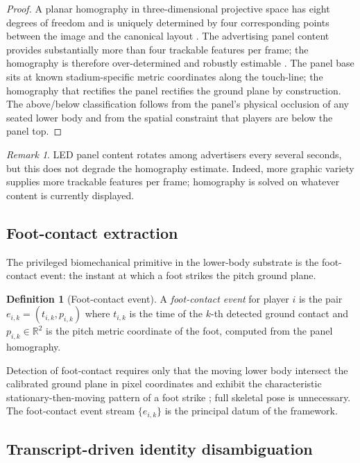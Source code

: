 \documentclass[11pt,twocolumn,a4paper]{article}
\theoremstyle{definition}
\newtheorem{definition}[theorem]{Definition}
\theoremstyle{remark}
\newtheorem{remark}[theorem]{Remark}
\begin{document}
\begin{proof}
A planar homography in three-dimensional projective space has eight
degrees of freedom and is uniquely determined by four corresponding
points between the image and the canonical layout
\citep{hartley2003,zhang2000}. The advertising panel content provides
substantially more than four trackable features per frame; the
homography is therefore over-determined and robustly estimable
\citep{fischler1981}. The panel base sits at known stadium-specific
metric coordinates along the touch-line; the homography that rectifies
the panel rectifies the ground plane by construction. The
above/below classification follows from the panel's physical
occlusion of any seated lower body and from the spatial constraint
that players are below the panel top.
\end{proof}

\begin{remark}
LED panel content rotates among advertisers every several seconds, but
this does not degrade the homography estimate. Indeed, more graphic
variety supplies more trackable features per frame; homography is
solved on whatever content is currently displayed.
\end{remark}

\subsection{Foot-contact extraction}

The privileged biomechanical primitive in the lower-body substrate is
the foot-contact event: the instant at which a foot strikes the pitch
ground plane.

\begin{definition}[Foot-contact event]
\label{def:fce}
A \emph{foot-contact event} for player $i$ is the pair
$e_{i,k} = (t_{i,k}, p_{i,k})$ where $t_{i,k}$ is the time of the
$k$-th detected ground contact and $p_{i,k} \in \mathbb{R}^2$ is the
pitch metric coordinate of the foot, computed from the panel
homography.
\end{definition}

Detection of foot-contact requires only that the moving lower body
intersect the calibrated ground plane in pixel coordinates and
exhibit the characteristic stationary-then-moving pattern of a foot
strike \citep{novacheck1998}; full skeletal pose is unnecessary. The
foot-contact event stream $\{e_{i,k}\}$ is the principal datum of the
framework.

\subsection{Transcript-driven identity disambiguation}
\end{document}
